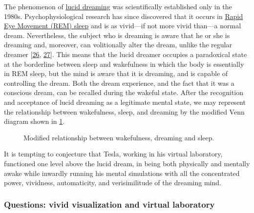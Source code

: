 \documentclass[
  a4paper,
]{article}
\begin{document}
The phenomenon of \href{https://en.wikipedia.org/wiki/Lucid_dream}{lucid
dreaming} was scientifically established only in the 1980s.
Psychophysiological research has since discovered that it occurs in
\href{https://en.wikipedia.org/wiki/Rapid_eye_movement_sleep}{Rapid Eye
Movement (REM) sleep} and is as vivid---if not more vivid than---a
normal dream. Nevertheless, the subject who is dreaming is aware that he
or she is dreaming and, moreover, can volitionally alter the dream,
unlike the regular dreamer {[}\protect\hyperlink{ref-laberge85}{26},
\protect\hyperlink{ref-laberge2000}{27}{]}. This means that the lucid
dreamer occupies a paradoxical state at the borderline between sleep and
wakefulness in which the body is essentially in REM sleep, but the mind
is aware that it is dreaming, and is capable of controlling the dream.
Both the dream experience, and the fact that it was a conscious dream,
can be recalled during the wakeful state. After the recognition and
acceptance of lucid dreaming as a legitimate mental state, we may
represent the relationship between wakefulness, sleep, and dreaming by
the modified Venn diagram shown in \cref{fig:lucid}.

\begin{figure}
\hypertarget{fig:lucid}{%
\centering

\caption[Modified relationship between wakefulness, dreaming and
sleep.]{Modified relationship between wakefulness, dreaming and
sleep.\footnotemark{}}\label{fig:lucid}
}
\end{figure}

It is tempting to conjecture that Tesla, working in his virtual
laboratory, functioned one level above the lucid dream, in being both
physically and mentally awake while inwardly running his mental
simulations with all the concentrated power, vividness, automaticity,
and verisimilitude of the dreaming mind.

\hypertarget{questions-vivid-visualization-and-virtual-laboratory}{%
\subsubsection{Questions: vivid visualization and virtual
laboratory}\label{questions-vivid-visualization-and-virtual-laboratory}}
\end{document}
